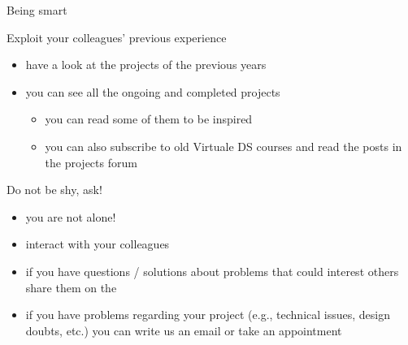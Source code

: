 \documentclass[presentation]{beamer}\mode<presentation>{\usetheme{AMSBolognaFC}}
\begin{document}
    
\begin{frame}[c,allowframebreaks]{Being smart}
    \begin{block}{Exploit your colleagues' previous experience}
        \begin{itemize}
            \item have a look at the projects of the previous years
            \item {} you can see all the ongoing and completed projects
            \begin{itemize}
                \item you can read some of them to be inspired
                \item you can also subscribe to old Virtuale DS courses and read the posts in the projects forum
            \end{itemize}
        \end{itemize}
    \end{block}
    
    \framebreak
    
    \begin{block}{Do not be shy, ask!}
        \begin{itemize}
            \item you are not alone!
            \item interact with your colleagues
            \item if you have questions / solutions about problems that could interest others share them on the 
            \item if you have problems regarding your project (e.g., technical issues, design doubts, etc.) you can write us an email or take an appointment
        \end{itemize}
    \end{block}
\end{frame}

\section*{}
\frame{\titlepage}
\end{document}

